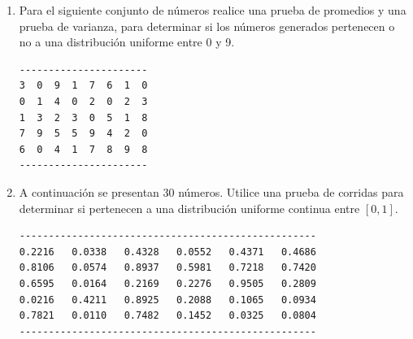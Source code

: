 \begin{enumerate}
\begin{verbatim}

---------------------------------------------------
0.7595   0.8716   0.4833   0.1373   0.0348   0.4988
0.5679   0.4649   0.1820   0.2033   0.5024   0.2933
0.3826   0.2801   0.0192   0.3295   0.2756   0.7712
0.5569   0.3824   0.6657   0.8896   0.0532   0.3213
0.5449   0.2334   0.8826   0.6979   0.5891   0.8457
---------------------------------------------------
\end{verbatim}
\begin{enumerate}[label=\alph*.]
\item Realice una prueba de promedios.
\item  Realice una prueba de variancia.
\item  Realice una prueba de corridas.
\item  Realice una prueba de huecos con dígitos.
\item  Realice una prueba de huecos con números.
\item  Realice una prueba de póker.
\item  Realice una prueba de series.
\end{enumerate}


\item Para el siguiente conjunto de números realice una prueba de promedios y una prueba de varianza, para determinar si los números generados pertenecen o no a una distribución uniforme entre 0 y 9.

\begin{verbatim}
----------------------
3  0  9  1  7  6  1  0
0  1  4  0  2  0  2  3
1  3  2  3  0  5  1  8
7  9  5  5  9  4  2  0
6  0  4  1  7  8  9  8
----------------------    
\end{verbatim}




\item A continuación se presentan 30 números. Utilice una prueba de corridas para determinar si pertenecen a una distribución uniforme continua entre $[0,1]$.
\begin{verbatim}
---------------------------------------------------
0.2216   0.0338   0.4328   0.0552   0.4371   0.4686
0.8106   0.0574   0.8937   0.5981   0.7218   0.7420
0.6595   0.0164   0.2169   0.2276   0.9505   0.2809
0.0216   0.4211   0.8925   0.2088   0.1065   0.0934
0.7821   0.0110   0.7482   0.1452   0.0325   0.0804
---------------------------------------------------
\end{verbatim}




\end{enumerate}
